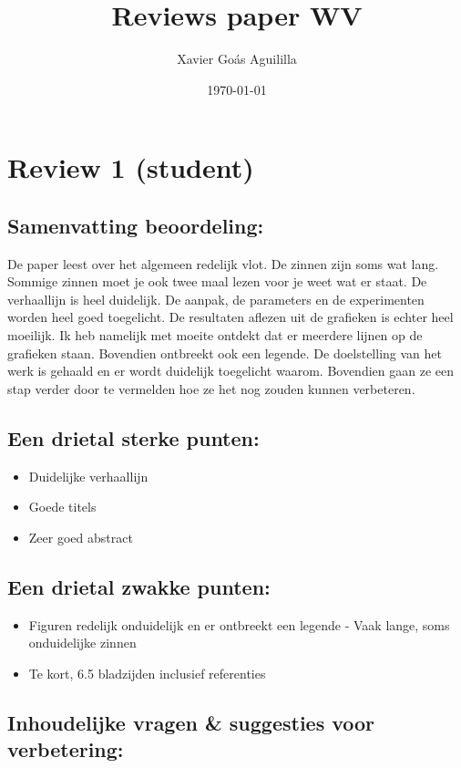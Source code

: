 \documentclass[11pt]{article}
\author{Xavier Goás Aguililla}
\date{\today}
\title{Reviews paper WV}
\begin{document}
\maketitle
\section{Review 1 (student)}

\subsection{Samenvatting beoordeling:}

De paper leest over het algemeen redelijk vlot. De zinnen zijn soms wat lang.
Sommige zinnen moet je ook twee maal lezen voor je weet wat er staat. De
verhaallijn is heel duidelijk. De aanpak, de parameters en de experimenten
worden heel goed toegelicht. De resultaten aflezen uit de grafieken is echter
heel moeilijk. Ik heb namelijk met moeite ontdekt dat er meerdere lijnen op de
grafieken staan. Bovendien ontbreekt ook een legende. De doelstelling van het
werk is gehaald en er wordt duidelijk toegelicht waarom. Bovendien gaan ze een
stap verder door te vermelden hoe ze het nog zouden kunnen verbeteren.

\subsection{Een drietal sterke punten:}

\begin{itemize}
\item Duidelijke verhaallijn
\item Goede titels
\item Zeer goed abstract
\end{itemize}

\subsection{Een drietal zwakke punten:}
\begin{itemize}
\item Figuren redelijk onduidelijk en er ontbreekt een legende - Vaak lange, soms onduidelijke zinnen

\item Te kort, 6.5 bladzijden inclusief referenties
\end{itemize}

\subsection{Inhoudelijke vragen \& suggesties voor verbetering:}
\end{document}
